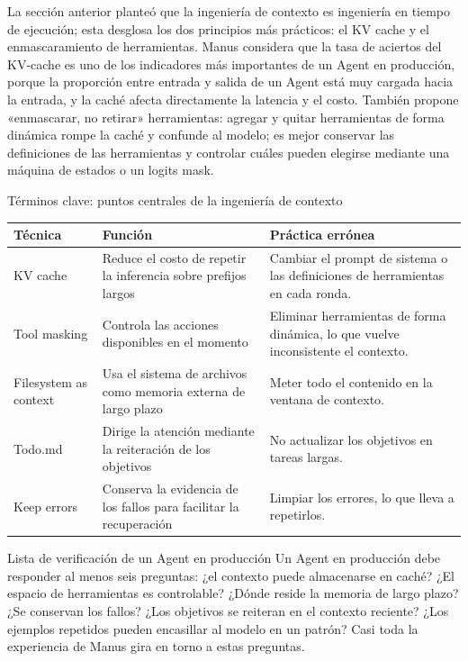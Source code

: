 \documentclass[a4paper]{article}
\begin{document}
La sección anterior planteó que la ingeniería de contexto es ingeniería en tiempo de ejecución; esta desglosa los dos principios más prácticos: el KV cache y el enmascaramiento de herramientas. Manus considera que la tasa de aciertos del KV-cache es uno de los indicadores más importantes de un Agent en producción, porque la proporción entre entrada y salida de un Agent está muy cargada hacia la entrada, y la caché afecta directamente la latencia y el costo. También propone «enmascarar, no retirar» herramientas: agregar y quitar herramientas de forma dinámica rompe la caché y confunde al modelo; es mejor conservar las definiciones de las herramientas y controlar cuáles pueden elegirse mediante una máquina de estados o un logits mask.

\begin{knowledgebox}{Términos clave: puntos centrales de la ingeniería de contexto}
\begin{tabularx}{\textwidth}{p{}p{}X}
\toprule
Técnica & Función & Práctica errónea \\
\midrule
KV cache & Reduce el costo de repetir la inferencia sobre prefijos largos & Cambiar el prompt de sistema o las definiciones de herramientas en cada ronda. \\
Tool masking & Controla las acciones disponibles en el momento & Eliminar herramientas de forma dinámica, lo que vuelve inconsistente el contexto. \\
Filesystem as context & Usa el sistema de archivos como memoria externa de largo plazo & Meter todo el contenido en la ventana de contexto. \\
Todo.md & Dirige la atención mediante la reiteración de los objetivos & No actualizar los objetivos en tareas largas. \\
Keep errors & Conserva la evidencia de los fallos para facilitar la recuperación & Limpiar los errores, lo que lleva a repetirlos. \\
\bottomrule
\end{tabularx}
\end{knowledgebox}

\begin{importantbox}{Lista de verificación de un Agent en producción}
Un Agent en producción debe responder al menos seis preguntas: ¿el contexto puede almacenarse en caché? ¿El espacio de herramientas es controlable? ¿Dónde reside la memoria de largo plazo? ¿Se conservan los fallos? ¿Los objetivos se reiteran en el contexto reciente? ¿Los ejemplos repetidos pueden encasillar al modelo en un patrón? Casi toda la experiencia de Manus gira en torno a estas preguntas.
\end{importantbox}
\end{document}
